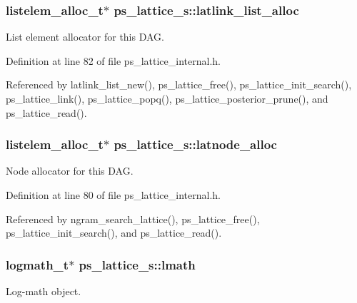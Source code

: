 \subsubsection[{latlink\+\_\+list\+\_\+alloc}]{\setlength{\rightskip}{0pt plus 5cm}listelem\+\_\+alloc\+\_\+t$\ast$ ps\+\_\+lattice\+\_\+s\+::latlink\+\_\+list\+\_\+alloc}\label{structps__lattice__s_a8e9cfaf92f9a3588d018578854c61e88}


List element allocator for this D\+A\+G. 



Definition at line 82 of file ps\+\_\+lattice\+\_\+internal.\+h.



Referenced by latlink\+\_\+list\+\_\+new(), ps\+\_\+lattice\+\_\+free(), ps\+\_\+lattice\+\_\+init\+\_\+search(), ps\+\_\+lattice\+\_\+link(), ps\+\_\+lattice\+\_\+popq(), ps\+\_\+lattice\+\_\+posterior\+\_\+prune(), and ps\+\_\+lattice\+\_\+read().

\subsubsection[{latnode\+\_\+alloc}]{\setlength{\rightskip}{0pt plus 5cm}listelem\+\_\+alloc\+\_\+t$\ast$ ps\+\_\+lattice\+\_\+s\+::latnode\+\_\+alloc}\label{structps__lattice__s_a14e4e87550647d5119cd1cc48ff4f3f1}


Node allocator for this D\+A\+G. 



Definition at line 80 of file ps\+\_\+lattice\+\_\+internal.\+h.



Referenced by ngram\+\_\+search\+\_\+lattice(), ps\+\_\+lattice\+\_\+free(), ps\+\_\+lattice\+\_\+init\+\_\+search(), and ps\+\_\+lattice\+\_\+read().

\subsubsection[{lmath}]{\setlength{\rightskip}{0pt plus 5cm}logmath\+\_\+t$\ast$ ps\+\_\+lattice\+\_\+s\+::lmath}\label{structps__lattice__s_a28f4ff5039e0961d57331d2605801010}


Log-\/math object. 



